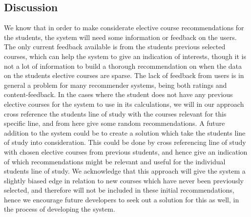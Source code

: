 \subsection{Discussion}
We know that in order to make considerate elective course recommendations for the students, the system will need some information or feedback on the users. The only current feedback available is from the students previous selected courses, which can help the system to give an indication of interests, though it is not a lot of information to build a thorough recommendation on when the data on the students elective courses are sparse. The lack of feedback from users is in general a problem for many recommender systems, being both ratings and content-feedback. In the cases where the student does not have any previous elective courses for the system to use in its calculations, we will in our approach cross reference the students line of study with the courses relevant for this specific line, and from here give some random recommendations. A future addition to the system could be to create a solution which take the students line of study into consideration. This could be done by cross referencing line of study with chosen elective courses from previous students, and hence give an indication of which recommendations might be relevant and useful for the individual students line of study. We acknowledge that this approach will give the system a slightly biased edge in relation to new courses which have never been previously selected, and therefore will not be included in these initial recommendations, hence we encourage future developers to seek out a solution for this as well, in the process of developing the system.\\
 
